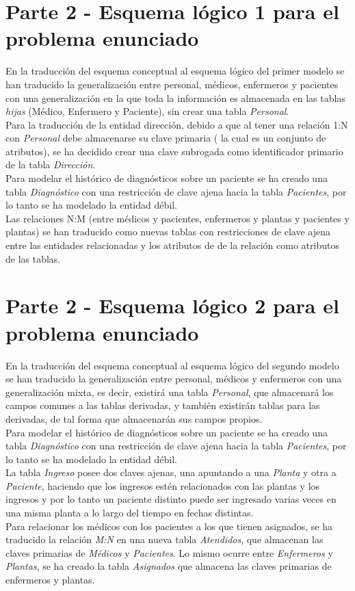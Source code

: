 \documentclass{article}
\begin{document}
\section{Parte 2 - Esquema lógico 1 para el problema enunciado}

En la traducción del esquema conceptual al esquema lógico del primer modelo se han traducido la generalización entre personal, médicos, enfermeros y pacientes con una generalización en la que toda la información es almacenada en las tablas \emph{hijas} (Médico, Enfermero y Paciente), sin crear una tabla \emph{Personal}.\\
Para la traducción de la entidad dirección, debido a que al tener una relación 1:N con \emph{Personal} debe almacenarse su clave primaria ( la cual es un conjunto de atributos), se ha decidido crear una clave subrogada como identificador primario de la tabla \emph{Dirección}.\\
Para modelar el histórico de diagnósticos sobre un paciente se ha creado una tabla \emph{Diagnóstico} con una restricción de clave ajena hacia la tabla \emph{Pacientes}, por lo tanto se ha modelado la entidad débil.\\
Las relaciones N:M (entre médicos y pacientes, enfermeros y plantas y pacientes y plantas) se han traducido como nuevas tablas con restricciones de clave ajena entre las entidades relacionadas y los atributos de de la relación como atributos de las tablas.

\section{Parte 2 - Esquema lógico 2 para el problema enunciado}

En la traducción del esquema conceptual al esquema lógico del segundo modelo se han traducido la generalización entre personal, médicos y enfermeros con una generalización mixta, es decir, existirá una tabla \emph{Personal}, que almacenará los campos comunes a las tablas derivadas, y también existirán tablas para las derivadas, de tal forma que almacenarán sus campos propios.\\
Para modelar el histórico de diagnósticos sobre un paciente se ha creado una tabla \emph{Diagnóstico} con una restricción de clave ajena hacia la tabla \emph{Pacientes}, por lo tanto se ha modelado la entidad débil.\\
La tabla \emph{Ingreso} posee dos claves ajenas, una apuntando a una \emph{Planta} y otra a \emph{Paciente}, haciendo que los ingresos estén relacionados con las plantas y los ingresos y por lo tanto un paciente distinto puede ser ingresado varias veces en una misma planta a lo largo del tiempo en fechas distintas.\\
Para relacionar los médicos con los pacientes a los que tienen asignados, se ha traducido la relación \emph{M:N} en una nueva tabla \emph{Atendidos}, que almacenan las claves primarias de \emph{Médicos} y \emph{Pacientes}. Lo mismo ocurre entre \emph{Enfermeros} y \emph{Plantas}, se ha creado la tabla \emph{Asignados} que almacena las claves primarias de enfermeros y plantas.\\
\end{document}
